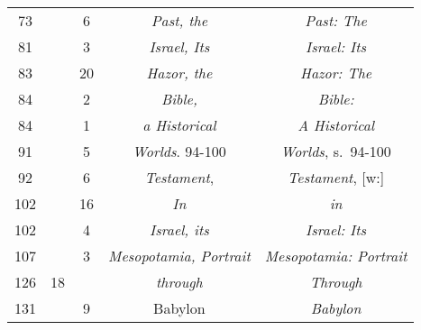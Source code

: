 \documentclass[a4paper,11pt]{article}
\begin{document}
\begin{center}
\begin{tabular}{|c|c|c|c|c|}
    73  & & \hphantom{0}6 & \textit{Past, the} & \textit{Past: The} \\
    81  & & \hphantom{0}3 & \textit{Israel, Its} & \textit{Israel: Its} \\
    83  & & 20 & \textit{Hazor, the} & \textit{Hazor: The} \\
    84  & & \hphantom{0}2 & \textit{Bible,} & \textit{Bible:} \\
    84  & & \hphantom{0}1 & \textit{a Historical} & \textit{A Historical} \\
    91  & & \hphantom{0}5 & \textit{Worlds}. 94-100
    & \textit{Worlds}, s.~94-100 \\
    92  & & \hphantom{0}6 & \textit{Testament},
    & \textit{Testament}, [w:] \\
    102 & & 16 & \textit{In} & \textit{in} \\
    102 & & \hphantom{0}4 & \textit{Israel, its} & \textit{Israel: Its} \\
    107 & & \hphantom{0}3 & \textit{Mesopotamia, Portrait}
           & \textit{Mesopotamia: Portrait} \\
    126 & 18 & & \textit{through} & \textit{Through} \\
    131 & & \hphantom{0}9 & Babylon & \textit{Babylon} \\
    \hline
  \end{tabular}






\end{center}
\end{document}
